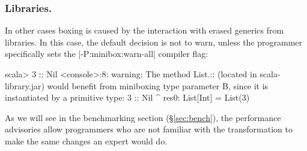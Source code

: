 \subsubsection*{Libraries.} In other cases boxing is caused by the interaction with erased generics from libraries. In this case, the default decision is not to warn, unless the programmer specifically sets the |-P:minibox:warn-all| compiler flag:

\begin{lstlisting-nobreak-nolang}
 scala> 3 :: Nil
 <console>:8: warning: The method List.:: (located in scala-library.jar) would benefit from miniboxing type parameter B, since it is instantiated by a primitive type:
               3 :: Nil
                 ^
 res0: List[Int] = List(3)
\end{lstlisting-nobreak-nolang}

As we will see in the benchmarking section (\S\ref{sec:bench}), the performance advisories allow programmers who are not familiar with the transformation to make the same changes an expert would do.
